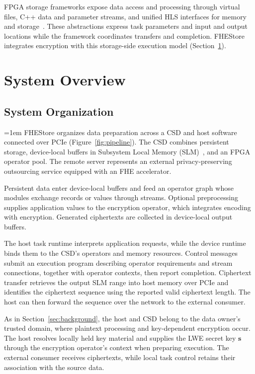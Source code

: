 \documentclass[sigconf,anonymous,balance=false]{acmart}
\newcommand{\bodypar}{\par\vskip 0pt plus 6pt\relax}
\begin{document}
FPGA storage frameworks expose data access and processing through virtual files, C++ data and parameter streams, and unified HLS interfaces for memory and storage~\cite{ruan2019insider,wong2024dongle}. These abstractions express task parameters and input and output locations while the framework coordinates transfers and completion. FHEStore integrates encryption with this storage-side execution model (Section~\ref{sec:architecture}).

\section{System Overview}
\label{sec:architecture}

\subsection{System Organization}
\label{subsec:system-organization}

\begingroup
\emergencystretch=1em
FHEStore organizes data preparation across a CSD and host software connected over PCIe (Figure~\ref{fig:pipeline}). The CSD combines persistent storage, device-local buffers in Subsystem Local Memory (SLM)~\cite{nvme2025slm}, and an FPGA operator pool. The remote server represents an external privacy-preserving outsourcing service equipped with an FHE accelerator.
\par
\endgroup
\bodypar

Persistent data enter device-local buffers and feed an operator graph whose modules exchange records or values through streams. Optional preprocessing supplies application values to the encryption operator, which integrates encoding with encryption. Generated ciphertexts are collected in device-local output buffers.
\bodypar

The host task runtime interprets application requests, while the device runtime binds them to the CSD's operators and memory resources. Control messages submit an execution program describing operator requirements and stream connections, together with operator contexts, then report completion. Ciphertext transfer retrieves the output SLM range into host memory over PCIe and identifies the ciphertext sequence using the reported valid ciphertext length. The host can then forward the sequence over the network to the external consumer.
\bodypar

As in Section~\ref{sec:background}, the host and CSD belong to the data owner's trusted domain, where plaintext processing and key-dependent encryption occur. The host resolves locally held key material and supplies the LWE secret key $\mathbf{s}$ through the encryption operator's context when preparing execution. The external consumer receives ciphertexts, while local task control retains their association with the source data.
\end{document}
